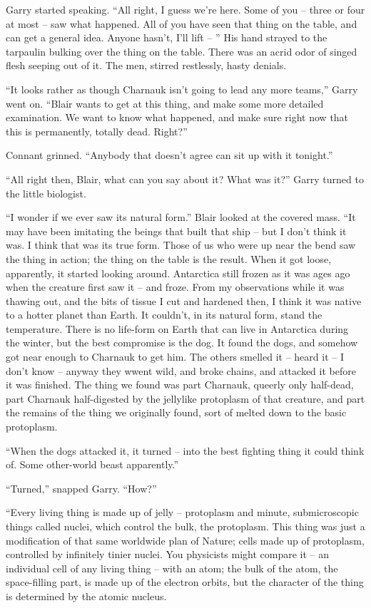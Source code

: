 \documentclass[ebook,oneside,11pt]{memoir}				%
\begin{document}
Garry started speaking. ``All right, I guess we're here. Some of you -- three or four at most -- saw what happened. All of you have seen that thing on the table, and can get a general idea. Anyone hasn't, I'll lift -- '' His hand strayed to the tarpaulin bulking over the thing on the table. There was an acrid odor of singed flesh seeping out of it. The men, stirred restlessly, hasty denials.

``It looks rather as though Charnauk isn't going to lead any more teams,'' Garry went on. ``Blair wants to get at this thing, and make some more detailed examination. We want to know what happened, and make sure right now that this is permanently, totally dead. Right?''

Connant grinned. ``Anybody that doesn't agree can sit up with it tonight.''

``All right then, Blair, what can you say about it? What was it?'' Garry turned to the little biologist.

``I wonder if we ever saw its natural form.'' Blair looked at the covered mass. ``It may have been imitating the beings that built that ship -- but I don't think it was. I think that was its true form. Those of us who were up near the bend saw the thing in action; the thing on the table is the result. When it got loose, apparently, it started looking around. Antarctica still frozen as it was ages ago when the creature first saw it -- and froze. From my observations while it was thawing out, and the bits of tissue I cut and hardened then, I think it was native to a hotter planet than Earth. It couldn't, in its natural form, stand the temperature. There is no life-form on Earth that can live in Antarctica during the winter, but the best compromise is the dog. It found the dogs, and somehow got near enough to Charnauk to get him. The others smelled it -- heard it -- I don't know -- anyway they wwent wild, and broke chains, and attacked it before it was finished. The thing we found was part Charnauk, queerly only half-dead, part Charnauk half-digested by the jellylike protoplasm of that creature, and part the remains of the thing we originally found, sort of melted down to the basic protoplasm.

``When the dogs attacked it, it turned -- into the best fighting thing it could think of. Some other-world beast apparently.''

``Turned,'' snapped Garry. ``How?''

``Every living thing is made up of jelly -- protoplasm and minute, submicroscopic things called nuclei, which control the bulk, the protoplasm. This thing was just a modification of that same worldwide plan of Nature; cells made up of protoplasm, controlled by infinitely tinier nuclei. You physicists might compare it -- an individual cell of any living thing -- with an atom; the bulk of the atom, the space-filling part, is made up of the electron orbits, but the character of the thing is determined by the atomic nucleus.
\end{document}
